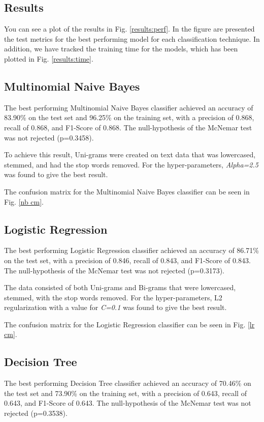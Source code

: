 \documentclass[a4paper, 11pt]{article}
\begin{document}
\begin{multicols}{2}

\section{Results}

You can see a plot of the results in Fig. \ref{results:perf}. In the figure are presented the test metrics for the best performing model for each classification technique. In addition, we have tracked the training time for the models, which has been plotted in Fig. \ref{results:time}.

\subsection{Multinomial Naive Bayes}

The best performing Multinomial Naive Bayes classifier achieved an accuracy of 83.90\% on the test set and 96.25\% on the training set, with a precision of 0.868, recall of 0.868, and F1-Score of 0.868. The null-hypothesis of the McNemar test was not rejected (p=0.3458).

To achieve this result, Uni-grams were created on text data that was lowercased, stemmed, and had the stop words removed. For the hyper-parameters, \emph{Alpha=2.5} was found to give the best result.

The confusion matrix for the Multinomial Naive Bayes classifier can be seen in Fig. \ref{nb cm}.

\subsection{Logistic Regression}
The best performing Logistic Regression classifier achieved an accuracy of 86.71\% on the test set, with a precision of 0.846, recall of 0.843, and F1-Score of 0.843. The null-hypothesis of the McNemar test was not rejected (p=0.3173).

The data consisted of both Uni-grams and Bi-grams that were lowercased, stemmed, with the stop words removed. For the hyper-parameters, L2 regularization with a value for \emph{C=0.1} was found to give the best result.

The confusion matrix for the Logistic Regression classifier can be seen in Fig. \ref{lr cm}.

\subsection{Decision Tree}
The best performing Decision Tree classifier achieved an accuracy of 70.46\% on the test set and 73.90\% on the training set, with a precision of 0.643, recall of 0.643, and F1-Score of 0.643. The null-hypothesis of the McNemar test was not rejected (p=0.3538).


\end{multicols}
\end{document}
